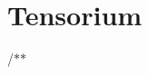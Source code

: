 \chapter{Tensorium}
\hypertarget{index}{}\label{index}
\label{index_md_mainpage}%
%
 /\texorpdfstring{$\ast$}{*}\texorpdfstring{$\ast$}{*}
\begin{DoxyItemize}
\item 
\end{DoxyItemize}